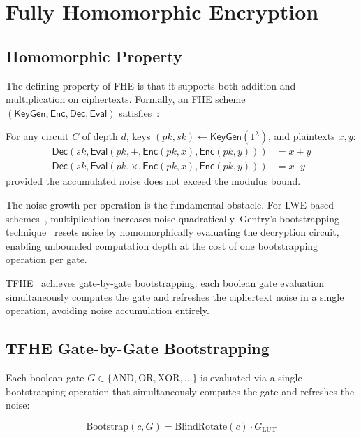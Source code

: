 \section{Fully Homomorphic Encryption}


\subsection{Homomorphic Property}

The defining property of FHE is that it supports both addition and
multiplication on ciphertexts. Formally, an FHE scheme
$(\mathsf{KeyGen}, \mathsf{Enc}, \mathsf{Dec}, \mathsf{Eval})$
satisfies~\cite{gentry2009}:

\begin{theorem}
For any circuit $C$ of depth $d$, keys $(pk, sk) \leftarrow
\mathsf{KeyGen}(1^\lambda)$, and plaintexts $x, y$:
\begin{align}
\mathsf{Dec}(sk, \mathsf{Eval}(pk, +, \mathsf{Enc}(pk,x),
  \mathsf{Enc}(pk,y))) &= x + y \\
\mathsf{Dec}(sk, \mathsf{Eval}(pk, \times, \mathsf{Enc}(pk,x),
  \mathsf{Enc}(pk,y))) &= x \cdot y
\end{align}
provided the accumulated noise does not exceed the modulus bound.
\end{theorem}

The noise growth per operation is the fundamental obstacle. For
LWE-based schemes~\cite{gsw2013}, multiplication increases noise
quadratically. Gentry's bootstrapping technique~\cite{gentry2009}
resets noise by homomorphically evaluating the decryption circuit,
enabling unbounded computation depth at the cost of one bootstrapping
operation per gate.

TFHE~\cite{tfhe2016} achieves gate-by-gate bootstrapping: each
boolean gate evaluation simultaneously computes the gate and refreshes
the ciphertext noise in a single operation, avoiding noise
accumulation entirely.

\subsection{TFHE Gate-by-Gate Bootstrapping}

Each boolean gate $G \in \{\text{AND}, \text{OR}, \text{XOR}, \ldots\}$
is evaluated via a single bootstrapping operation that simultaneously
computes the gate and refreshes the noise:

\[
\text{Bootstrap}(c, G) = \text{BlindRotate}(c) \cdot G_{\text{LUT}}
\]

